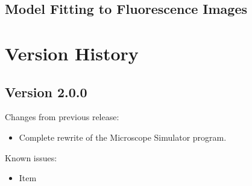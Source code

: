 \documentclass[11pt,titlepage,twoside]{article}
\begin{document}
\subsection{Model Fitting to Fluorescence Images}
\label{sec:ModelFittingToFluorescenceImages}



\section{Version History}

\subsection{Version 2.0.0}

\noindent
Changes from previous release:
\begin{itemize}
\item Complete rewrite of the Microscope Simulator program.
\end{itemize}

\noindent
Known issues:
\begin{itemize}
\item Item
\end{itemize}
\end{document}
